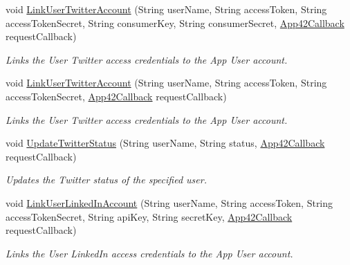 \begin{DoxyCompactItemize}
void \hyperlink{classcom_1_1shephertz_1_1app42_1_1paas_1_1sdk_1_1windows_1_1social_1_1_social_service_af95eda1c1c631508e0e502bbf2765560}{Link\+User\+Twitter\+Account} (String user\+Name, String access\+Token, String access\+Token\+Secret, String consumer\+Key, String consumer\+Secret, \hyperlink{interfacecom_1_1shephertz_1_1app42_1_1paas_1_1sdk_1_1windows_1_1_app42_callback}{App42\+Callback} request\+Callback)
\begin{DoxyCompactList}\small\item\em Links the User Twitter access credentials to the App User account. \end{DoxyCompactList}\item 
void \hyperlink{classcom_1_1shephertz_1_1app42_1_1paas_1_1sdk_1_1windows_1_1social_1_1_social_service_ac800d52e9d6792211a8e06a6d14f2e28}{Link\+User\+Twitter\+Account} (String user\+Name, String access\+Token, String access\+Token\+Secret, \hyperlink{interfacecom_1_1shephertz_1_1app42_1_1paas_1_1sdk_1_1windows_1_1_app42_callback}{App42\+Callback} request\+Callback)
\begin{DoxyCompactList}\small\item\em Links the User Twitter access credentials to the App User account. \end{DoxyCompactList}\item 
void \hyperlink{classcom_1_1shephertz_1_1app42_1_1paas_1_1sdk_1_1windows_1_1social_1_1_social_service_a4580858f7075c75b0dde60071a8bc43a}{Update\+Twitter\+Status} (String user\+Name, String status, \hyperlink{interfacecom_1_1shephertz_1_1app42_1_1paas_1_1sdk_1_1windows_1_1_app42_callback}{App42\+Callback} request\+Callback)
\begin{DoxyCompactList}\small\item\em Updates the Twitter status of the specified user. \end{DoxyCompactList}\item 
void \hyperlink{classcom_1_1shephertz_1_1app42_1_1paas_1_1sdk_1_1windows_1_1social_1_1_social_service_a59449f7ba28608c7d936630b5f264198}{Link\+User\+Linked\+In\+Account} (String user\+Name, String access\+Token, String access\+Token\+Secret, String api\+Key, String secret\+Key, \hyperlink{interfacecom_1_1shephertz_1_1app42_1_1paas_1_1sdk_1_1windows_1_1_app42_callback}{App42\+Callback} request\+Callback)
\begin{DoxyCompactList}\small\item\em Links the User Linked\+In access credentials to the App User account. \end{DoxyCompactList}\item 

\end{DoxyCompactItemize}
